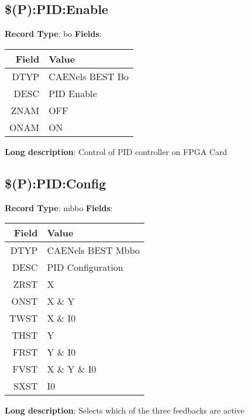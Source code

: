 \subsection{\$(P):PID:Enable}
\textbf{Record Type}: bo \newline \newline 
\textbf{Fields}: \newline 
\begin{tabularx}{0.7\linewidth}{|r|X|}
\hline Field & Value \\
\hline
\hline
DTYP & CAENels BEST Bo\\
\hline
DESC & PID Enable\\
\hline
ZNAM & OFF\\
\hline
ONAM & ON\\
\hline
\end{tabularx}
\newline \newline \newline
\textbf{Long description}: \newline 
 Control of PID controller on FPGA Card
\newline \newline


\subsection{\$(P):PID:Config}
\textbf{Record Type}: mbbo \newline \newline 
\textbf{Fields}: \newline 
\begin{tabularx}{0.7\linewidth}{|r|X|}
\hline Field & Value \\
\hline
\hline
DTYP & CAENels BEST Mbbo\\
\hline
DESC & PID Configuration\\
\hline
ZRST & X\\
\hline
ONST & X \& Y\\
\hline
TWST & X \& I0\\
\hline
THST & Y\\
\hline
FRST & Y \& I0\\
\hline
FVST & X \& Y \& I0\\
\hline
SXST & I0\\
\hline
\end{tabularx}
\newline \newline \newline
\textbf{Long description}: \newline 
 Selects which of the three feedbacks are active
\newline \newline



